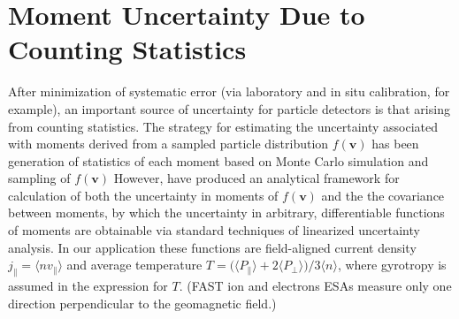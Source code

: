 
\chapter{Moment Uncertainty Due to Counting Statistics}
\label{app:A}

  After minimization of systematic error (via laboratory and in situ
  calibration, for example), an important source of uncertainty for
  particle detectors is that arising from counting
  statistics. The strategy for estimating the uncertainty
  associated with moments derived from a sampled particle distribution
  $f ( \mathbf{v} ) $ has been generation of statistics of each moment based
  on Monte Carlo simulation and sampling of $f(\mathbf{v})$ \citep[e.g.][]{Paschmann1998,Gershman2013}
  However, \citet{Gershman2015} have produced an analytical framework
  for calculation of both the uncertainty in moments of $f (
  \mathbf{v} ) $ and the the covariance between moments, by which the
  uncertainty in arbitrary, differentiable functions of moments are
  obtainable via standard techniques of linearized uncertainty
  analysis. In our application these functions are field-aligned
  current density $j_\parallel = \langle n v_\parallel \rangle$ and
  average temperature $T = \big ( \langle P_{\parallel} \rangle + 2
  \langle P_{\perp} \rangle \big ) \big / 3 \langle n \rangle $, where
  gyrotropy is assumed in the expression for $T$. (FAST ion and
  electrons ESAs measure only one direction perpendicular to the
  geomagnetic field.)

